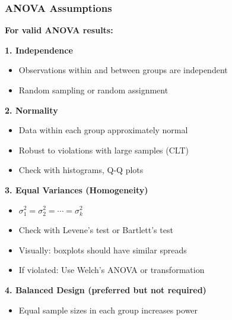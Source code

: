 \documentclass{beamer}
\begin{document}
\begin{frame}
\frametitle{ANOVA Assumptions}
\textbf{For valid ANOVA results:}

\vspace{0.1cm}
\textbf{1. Independence}
\begin{itemize}
\setlength\itemsep{-0.2em}
\item Observations within and between groups are independent
\item Random sampling or random assignment
\end{itemize}

\vspace{0.1cm}
\textbf{2. Normality}
\begin{itemize}
\setlength\itemsep{-0.2em}
\item Data within each group approximately normal
\item Robust to violations with large samples (CLT)
\item Check with histograms, Q-Q plots
\end{itemize}

\vspace{0.1cm}
\textbf{3. Equal Variances (Homogeneity)}
\begin{itemize}
\setlength\itemsep{-0.2em}
\item $\sigma_1^2 = \sigma_2^2 = \cdots = \sigma_k^2$
\item Check with Levene's test or Bartlett's test
\item Visually: boxplots should have similar spreads
\item If violated: Use Welch's ANOVA or transformation
\end{itemize}

\vspace{0.1cm}
\textbf{4. Balanced Design (preferred but not required)}
\begin{itemize}
\setlength\itemsep{-0.2em}
\item Equal sample sizes in each group increases power
\end{itemize}
\end{frame}
\end{document}
